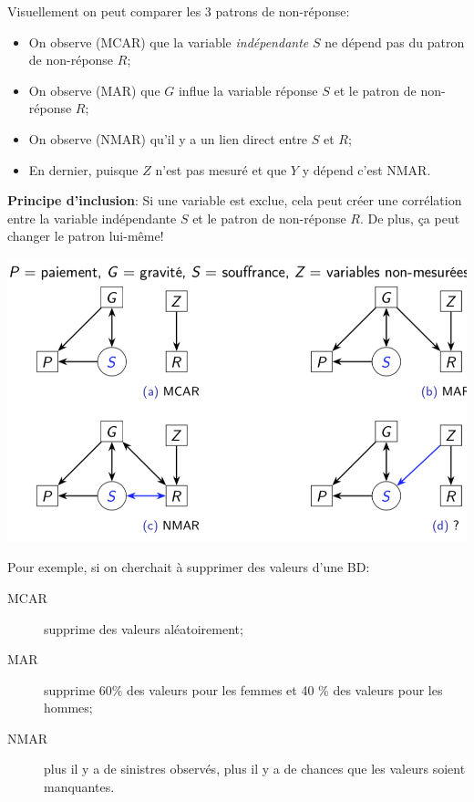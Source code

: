 \documentclass[10pt, french]{article}
\begin{document}
\begin{multicols*}{3}
Visuellement on peut comparer les 3 patrons de non-réponse:
\begin{itemize}[leftmargin = *]
	\item	On observe (MCAR) que la variable \textit{indépendante} $S$ ne dépend pas du patron de non-réponse $R$;
	\item	On observe (MAR) que $G$ influe la variable réponse $S$ et le patron de non-réponse $R$;
	\item	On observe (NMAR) qu'il y a un lien direct entre $S$ et $R$;
	\item	En dernier, puisque $Z$ n'est pas mesuré et que $Y$ y dépend c'est NMAR.
\end{itemize}
\textbf{Principe d'inclusion}: Si une variable est exclue, cela peut créer une corrélation entre la variable indépendante $S$ et le patron de non-réponse $R$. De plus, ça peut changer le patron lui-même!

\includegraphics[scale=0.2]{src/ACT-3114/data-schema-missing.png}

Pour exemple, si on cherchait à supprimer des valeurs d'une BD:
\begin{description}
	\item[MCAR]	supprime des valeurs aléatoirement;
	\item[MAR]	supprime 60\% des valeurs pour les femmes et 40 \% des valeurs pour les hommes;
	\item[NMAR]	plus il y a de sinistres observés, plus il y a de chances que les valeurs soient manquantes.
\end{description}


\end{multicols*}
\end{document}
